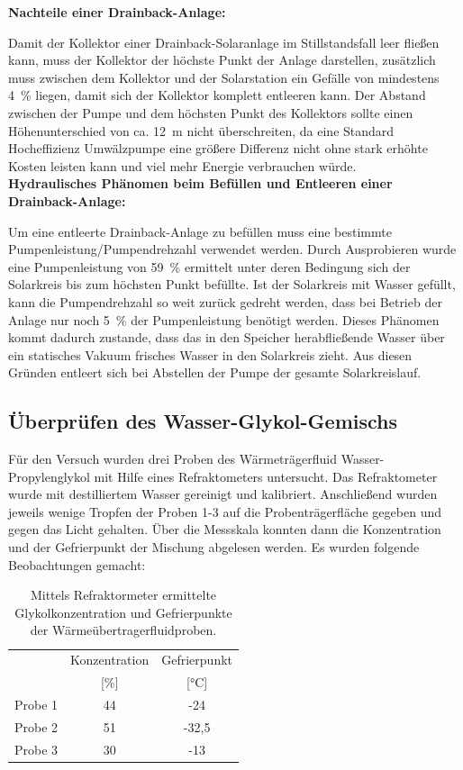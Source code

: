 \textbf{Nachteile einer Drainback-Anlage:}

Damit der Kollektor einer Drainback-Solaranlage im Stillstandsfall leer fließen kann, muss der Kollektor der höchste Punkt der Anlage darstellen, zusätzlich muss zwischen dem Kollektor und der Solarstation ein Gefälle von mindestens \SI{4}{\percent} liegen, damit sich der Kollektor komplett entleeren kann. 
Der Abstand zwischen der Pumpe und dem höchsten Punkt des Kollektors sollte einen Höhenunterschied von ca. \SI{12}{\meter} nicht überschreiten, da eine Standard Hocheffizienz Umwälzpumpe eine größere Differenz nicht ohne stark erhöhte Kosten leisten kann und viel mehr Energie verbrauchen würde. \\

\textbf{Hydraulisches Phänomen beim Befüllen und Entleeren einer Drainback-Anlage:}

Um eine entleerte Drainback-Anlage zu befüllen muss eine bestimmte Pumpenleistung/Pumpendrehzahl verwendet werden. Durch Ausprobieren wurde eine Pumpenleistung von \SI{59}{\percent} ermittelt unter deren Bedingung sich der Solarkreis bis zum höchsten Punkt befüllte. Ist der Solarkreis mit Wasser gefüllt, kann die Pumpendrehzahl so weit zurück gedreht werden, dass bei Betrieb der Anlage nur noch \SI{5}{\percent} der Pumpenleistung benötigt werden. Dieses Phänomen kommt dadurch zustande, dass das in den Speicher herabfließende Wasser über ein statisches Vakuum frisches Wasser in den Solarkreis zieht. Aus diesen Gründen entleert sich bei Abstellen der Pumpe der gesamte Solarkreislauf. 

\subsection{Überprüfen des Wasser-Glykol-Gemischs}

Für den Versuch wurden drei Proben des Wärmeträgerfluid Wasser-Propylenglykol mit Hilfe eines Refraktometers untersucht. Das Refraktometer wurde mit destilliertem Wasser gereinigt und kalibriert. Anschließend wurden jeweils wenige Tropfen der Proben 1-3 auf die Probenträgerfläche gegeben und gegen das Licht gehalten. Über die Messskala konnten dann die Konzentration und der Gefrierpunkt der Mischung abgelesen werden. Es wurden folgende Beobachtungen gemacht:

\begin{table}[H]
	\caption{Mittels Refraktormeter ermittelte Glykolkonzentration und Gefrierpunkte der Wärmeübertragerfluidproben.}
	\centering
	\begin{tabular}{lcc}
		& Konzentration  & Gefrierpunkt \\
		&{[}\%{]}& {[}°C{]}\\
		Probe 1 &       44               &          -24           \\
		Probe 2 &       51            &            -32,5     \\
		Probe 3 &           30           &          -13             
	\end{tabular}
\end{table}

